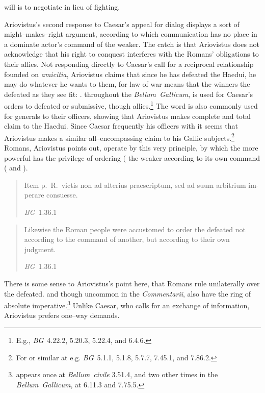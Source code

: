 \documentclass[12pt,letterpaper,oneside,final]{memoir}
\begin{document}
will is to negotiate in lieu of fighting.

Ariovistus's second response to Caesar's appeal for dialog displays a sort of might--makes--right argument, according to which communication has no place in a dominate actor's command of the weaker. The catch is that Ariovistus does not acknowledge that his right to conquest interferes with the Romans' obligations to their allies. Not responding directly to Caesar's call for a reciprocal relationship founded on \emph{amicitia}, Ariovistus claims that since he has defeated the Haedui, he may do whatever he wants to them, for law of war means that the winners  the defeated as they see fit: .  throughout the \emph{Bellum~Gallicum}, is used for Caesar's orders to defeated or submissive, though allies.\footnote{E.g., \emph{BG}~4.22.2, 5.20.3, 5.22.4, and 6.4.6.} The word is also commonly used for generals to their officers, showing that Ariovistus makes complete and total claim to the Haedui. Since Caesar frequently  his officers with  it seems that Ariovistus makes a similar all--encompassing claim to his Gallic subjects.\footnote{For  or similar at e.g. \emph{BG}~5.1.1, 5.1.8, 5.7.7, 7.45.1, and 7.86.2.} Romans, Ariovistus points out, operate by this very principle, by which the more powerful has the privilege of ordering ( the weaker according to its own command ( and ). \blockquote[\emph{BG}~1.36.1]{\textlatin{Item p.~R.~victis non ad alterius praescriptum, sed ad suum arbitrium imperare consuesse.}} \blockquote[\emph{BG}~1.36.1]{Likewise the Roman people were accustomed to order the defeated not according to the command of another, but according to their own judgment.} There is some sense to Ariovistus's point here, that Romans rule unilaterally over the defeated.  and  though uncommon in the \emph{Commentarii}, also have the ring of absolute imperative.\footnote{ appears once at \emph{Bellum~civile} 3.51.4, and  two other times in the \emph{Bellum~Gallicum}, at 6.11.3 and 7.75.5.} Unlike Caesar, who calls for an exchange of information, Ariovistus prefers one--way demands.
\end{document}
